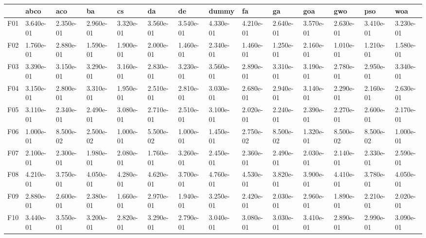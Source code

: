 \begin{table}
    \begin{adjustbox}{width=\linewidth}
        \begin{tabular}{llllllllllllll}
            \toprule
            {}   & abco      & aco       & ba        & cs        & da        & de        & dummy     & fa        & ga        & goa       & gwo       & pso       & woa       \\
            \midrule
            F01  & 3.640e-01 & 2.350e-01 & 2.960e-01 & 3.320e-01 & 3.560e-01 & 3.540e-01 & 4.330e-01 & 4.210e-01 & 2.640e-01 & 3.570e-01 & 2.630e-01 & 3.410e-01 & 3.230e-01 \\
            F02  & 1.760e-01 & 2.880e-01 & 1.590e-01 & 1.900e-01 & 2.000e-01 & 1.460e-01 & 2.340e-01 & 1.460e-01 & 1.250e-01 & 2.160e-01 & 1.010e-01 & 1.210e-01 & 1.580e-01 \\
            F03  & 3.390e-01 & 3.150e-01 & 3.290e-01 & 3.160e-01 & 2.830e-01 & 3.230e-01 & 3.560e-01 & 2.890e-01 & 3.310e-01 & 3.190e-01 & 2.780e-01 & 2.950e-01 & 3.340e-01 \\
            F04  & 3.150e-01 & 2.800e-01 & 3.310e-01 & 1.950e-01 & 2.510e-01 & 2.810e-01 & 3.030e-01 & 2.680e-01 & 2.940e-01 & 3.140e-01 & 2.290e-01 & 2.160e-01 & 2.630e-01 \\
            F05  & 3.110e-01 & 2.340e-01 & 2.490e-01 & 3.080e-01 & 2.710e-01 & 2.510e-01 & 3.100e-01 & 2.020e-01 & 2.240e-01 & 2.390e-01 & 2.270e-01 & 2.600e-01 & 2.170e-01 \\
            F06  & 1.000e-01 & 8.500e-02 & 2.500e-02 & 1.000e-01 & 5.500e-02 & 1.000e-01 & 1.450e-01 & 2.750e-02 & 8.500e-02 & 1.320e-01 & 8.500e-02 & 8.500e-02 & 1.000e-01 \\
            F07  & 2.100e-01 & 2.300e-01 & 1.980e-01 & 2.080e-01 & 1.760e-01 & 3.260e-01 & 2.450e-01 & 2.360e-01 & 2.490e-01 & 2.030e-01 & 2.140e-01 & 2.330e-01 & 2.590e-01 \\
            F08  & 4.210e-01 & 3.750e-01 & 4.050e-01 & 4.280e-01 & 4.620e-01 & 3.700e-01 & 4.760e-01 & 4.530e-01 & 3.820e-01 & 3.900e-01 & 4.410e-01 & 3.780e-01 & 4.050e-01 \\
            F09  & 2.880e-01 & 2.600e-01 & 2.380e-01 & 1.660e-01 & 2.970e-01 & 1.940e-01 & 3.250e-01 & 2.420e-01 & 2.030e-01 & 2.960e-01 & 1.890e-01 & 2.210e-01 & 2.020e-01 \\
            F10  & 3.440e-01 & 3.550e-01 & 3.200e-01 & 2.820e-01 & 3.290e-01 & 2.790e-01 & 3.040e-01 & 3.080e-01 & 3.030e-01 & 3.410e-01 & 2.890e-01 & 2.990e-01 & 3.090e-01 \\

\end{tabular}
\end{adjustbox}
\end{table}
